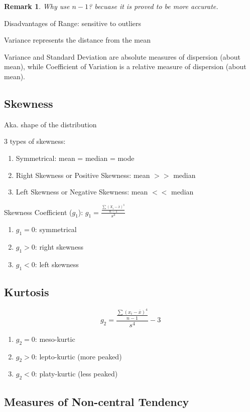 \documentclass[12pt,a4paper]{article}
\newtheorem*{rem}{Remark}
\newcommand{\Remark}[1]{
  \begin{rem}
    \color{cyan}
    #1
  \end{rem}
}
\begin{document}
\Remark{Why use $n-1$? becuase it is proved to be more accurate.}

Disadvantages of Range: sensitive to outliers

Variance represents the distance from the mean

Variance and Standard Deviation are absolute measures of dispersion (about mean),
while Coefficient of Variation is a relative measure of dispersion (about mean).

\subsection*{Skewness}

Aka. shape of the distribution

3 types of skewness:

\begin{enumerate}
    \item Symmetrical: mean = median = mode
    \item Right Skewness or Positive Skewness: mean $>>$ median
    \item Left Skewness or Negative Skewness: mean $<<$ median
\end{enumerate}

Skewness Coefficient ($g_1$): $g_1 = \frac{\frac{\sum (X_i - \bar{x})^3}{n-1}}{s^3}$

\begin{enumerate}
    \item $g_1 = 0$: symmetrical 
    \item $g_1 > 0$: right skewness
    \item $g_1 < 0$: left skewness
\end{enumerate}

\subsection*{Kurtosis}

\[ g_2 = \frac{\frac{\sum(x_i - \bar{x})^4}{n-1}}{s^4} - 3\]

\begin{enumerate}
    \item $g_2 = 0$: meso-kurtic
    \item $g_2 > 0$: lepto-kurtic (more peaked)
    \item $g_2 < 0$: platy-kurtic (less peaked)
\end{enumerate}

\subsection*{Measures of Non-central Tendency}
\end{document}
